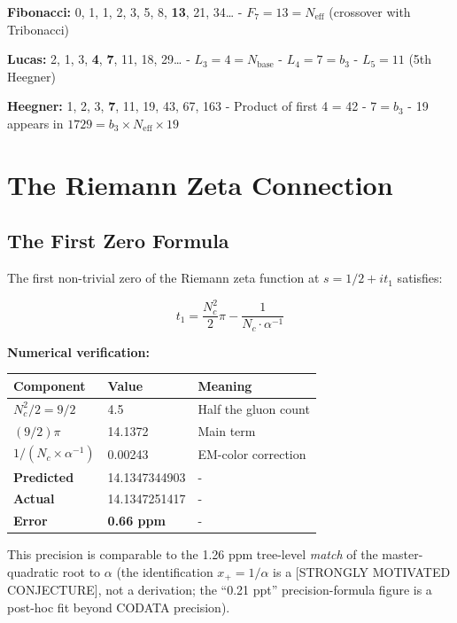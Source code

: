 \documentclass[
  11pt,
  letterpaper,
  twoside,
  openany]{book}
\makeatletter
\let\orig@section\section
\renewcommand{\section}{\needspace{8\baselineskip}\orig@section}
\let\orig@subsection\subsection
\renewcommand{\subsection}{\needspace{6\baselineskip}\orig@subsection}
\makeatother
\begin{document}
\textbf{Fibonacci:} 0, 1, 1, 2, 3, 5, 8, \textbf{13}, 21, 34\ldots{} -
\(F_7 = 13 = N_{\text{eff}}\) (crossover with Tribonacci)

\textbf{Lucas:} 2, 1, 3, \textbf{4}, \textbf{7}, 11, 18, 29\ldots{} -
\(L_3 = 4 = N_{\text{base}}\) - \(L_4 = 7 = b_3\) - \(L_5 = 11\) (5th
Heegner)

\textbf{Heegner:} 1, 2, 3, \textbf{7}, 11, 19, 43, 67, 163 - Product of
first 4 = 42 - \(7 = b_3\) - 19 appears in
\(1729 = b_3 \times N_{\text{eff}} \times 19\)

\section{The Riemann Zeta Connection}\label{the-riemann-zeta-connection}

\subsection{The First Zero Formula}\label{the-first-zero-formula}

The first non-trivial zero of the Riemann zeta function at
\(s = 1/2 + it_1\) satisfies:

\[t_1 = \frac{N_c^2}{2}\pi - \frac{1}{N_c \cdot \alpha^{-1}}\]

\textbf{Numerical verification:}

\begin{longtable}[]{@{}lll@{}}
\toprule\noalign{}
Component & Value & Meaning \\
\midrule\noalign{}
\endhead
\bottomrule\noalign{}
\endlastfoot
\(N_c^2/2 = 9/2\) & 4.5 & Half the gluon count \\
\((9/2)\pi\) & 14.1372 & Main term \\
\(1/(N_c \times \alpha^{-1})\) & 0.00243 & EM-color correction \\
\textbf{Predicted} & 14.1347344903 & - \\
\textbf{Actual} & 14.1347251417 & - \\
\textbf{Error} & \textbf{0.66 ppm} & - \\
\end{longtable}

This precision is comparable to the 1.26 ppm tree-level \emph{match} of
the master-quadratic root to \(\alpha\) (the identification
\(x_+=1/\alpha\) is a {[}STRONGLY MOTIVATED CONJECTURE{]}, not a
derivation; the ``0.21 ppt'' precision-formula figure is a post-hoc fit
beyond CODATA precision).
\end{document}
